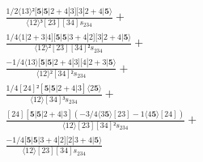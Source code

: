 \documentclass[varwidth, border=5pt]{standalone}
\begin{document}
\begin{my}
$\begin{gathered}
\scriptscriptstyle\frac{1/2⟨13⟩²[𝟓|𝟓|2+4|3][3|2+4|𝟓⟩}{⟨12⟩³[23][34]s_{234}} +\\
\scriptscriptstyle\frac{1/4⟨1|2+3|4][𝟓|𝟓|3+4|2][3|2+4|𝟓⟩}{⟨12⟩²[23][34]²s_{234}} +\\
\scriptscriptstyle\frac{-1/4⟨13⟩[𝟓|𝟓|2+4|3][4|2+3|𝟓⟩}{⟨12⟩²[34]²s_{234}} +\\
\scriptscriptstyle\frac{1/4[24]²[𝟓|𝟓|2+4|3]⟨2𝟓⟩}{⟨12⟩[34]³s_{234}} +\\
\scriptscriptstyle\frac{[24][𝟓|𝟓|2+4|3](-3/4⟨3𝟓⟩[23]-1⟨4𝟓⟩[24])}{⟨12⟩[23][34]²s_{234}} +\\
\scriptscriptstyle\frac{-1/4[𝟓|𝟓|3+4|2][2|3+4|𝟓⟩}{⟨12⟩[23][34]s_{234}} \phantom{+}
\end{gathered}$
\end{my}
\end{document}
